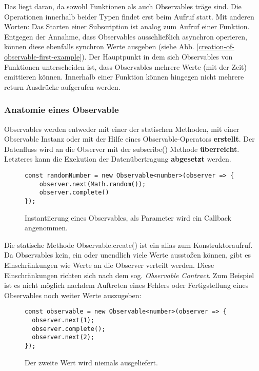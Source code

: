 \noindent
Das liegt daran, da sowohl Funktionen als auch Observables träge sind. Die Operationen innerhalb beider Typen findet erst beim Aufruf statt. Mit anderen Worten: Das Starten einer Subscription ist analog zum Aufruf einer Funktion. Entgegen der Annahme, dass Observables ausschließlich asynchron operieren, können diese ebenfalls synchron Werte ausgeben (siehe Abb. \ref{creation-of-observable-first-example}). Der Hauptpunkt in dem sich Observables von Funktionen unterscheiden ist, dass Observables mehrere Werte (mit der Zeit) emittieren können. Innerhalb einer Funktion können hingegen nicht mehrere return Ausdrücke aufgerufen werden.

\subsubsection{Anatomie eines Observable}
Observables werden entweder mit einer der statischen Methoden, mit einer Observable Instanz oder mit der Hilfe eines Observable-Operators \textbf{erstellt}. Der Datenfluss wird an die Observer mit der subscribe() Methode \textbf{überreicht}. Letzteres kann die Exekution der Datenübertragung \textbf{abgesetzt} werden.

\begin{figure}[H]
\begin{lstlisting}[basicstyle=\small]
const randomNumber = new Observable<number>(observer => {
    observer.next(Math.random());
    observer.complete()
});
\end{lstlisting}
\caption{Instantiierung eines Observables, als Parameter wird ein Callback angenommen.}
\end{figure}

\noindent
Die statische Methode Observable.create() ist ein alias zum Konstruktoraufruf. Da Observables kein, ein oder unendlich viele Werte ausstoßen können, gibt es Einschränkungen wie Werte an die Observer verteilt werden. Diese Einschränkungen richten sich nach dem sog. \textit{Observable Contract}. Zum Beispiel ist es nicht möglich nachdem Auftreten eines Fehlers oder Fertigstellung eines Observables noch weiter Werte auszugeben:

\begin{figure}[H]
\begin{lstlisting}[basicstyle=\small]
const observable = new Observable<number>(observer => {
  observer.next(1);
  observer.complete();
  observer.next(2);
});
\end{lstlisting}
\caption{Der zweite Wert wird niemals ausgeliefert.}
\end{figure}

